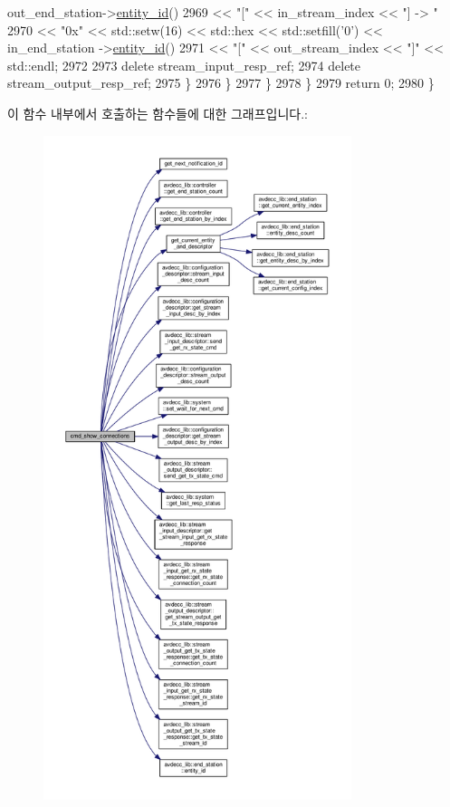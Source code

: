 \begin{DoxyCode}
      out\_end\_station->\hyperlink{classavdecc__lib_1_1end__station_a3374e7e9d63f8e1756480b16df9bc0c0}{entity\_id}()
2969                                 << \textcolor{stringliteral}{"["} << in\_stream\_index << \textcolor{stringliteral}{"] -> "}
2970                                 << \textcolor{stringliteral}{"0x"} << std::setw(16) << std::hex << std::setfill(\textcolor{charliteral}{'0'}) << in\_end\_station
      ->\hyperlink{classavdecc__lib_1_1end__station_a3374e7e9d63f8e1756480b16df9bc0c0}{entity\_id}()
2971                                 << \textcolor{stringliteral}{"["} << out\_stream\_index << \textcolor{stringliteral}{"]"} << std::endl;
2972 
2973                     \textcolor{keyword}{delete} stream\_input\_resp\_ref;
2974                     \textcolor{keyword}{delete} stream\_output\_resp\_ref;
2975                 \}
2976             \}
2977         \}
2978     \}
2979     \textcolor{keywordflow}{return} 0;
2980 \}
\end{DoxyCode}


이 함수 내부에서 호출하는 함수들에 대한 그래프입니다.\+:
\nopagebreak
\begin{figure}[H]
\begin{center}
\leavevmode
\includegraphics[height=550pt]{classcmd__line_a3154e7ccbcc97337b905604d2756f5d1_cgraph}
\end{center}
\end{figure}




